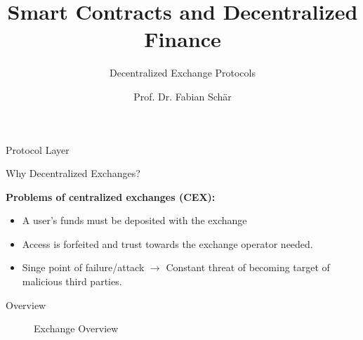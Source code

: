\documentclass[]{beamer}
\title{Smart Contracts and Decentralized Finance}
\subtitle{Decentralized Exchange Protocols}
\author{Prof. Dr. Fabian Schär}
\institute{University of Basel}
\begin{document}
\thispagestyle{empty}
\begin{frame}[noframenumbering]
	\titlepage
\end{frame}


\begin{frame}{Protocol Layer}
\begin{figure}
	\centering
	\resizebox{0.8\textwidth}{!}{
	\begin{tikzpicture}[scale=1.0, every node/.style={scale=1.0}]
		
	\end{tikzpicture}}	
\end{figure}
\end{frame}



\begin{frame}{Why Decentralized Exchanges?}

	\textbf{Problems of centralized exchanges (CEX):}
		\begin{small}
		\begin{itemize}
			\item A user's funds must be deposited with the exchange
			\item Access is forfeited and trust towards the exchange operator needed.
			\item Singe point of failure/attack $\rightarrow$ Constant threat of becoming target of malicious third parties.
		\end{itemize}
		\end{small}	

\vspace{1.5em}

\end{frame}

\begin{frame}{Overview}
	\begin{figure}[h!]
		
		\caption*{Exchange Overview \cite{FS:21}}
	\end{figure}
\end{frame}	
\end{document}
